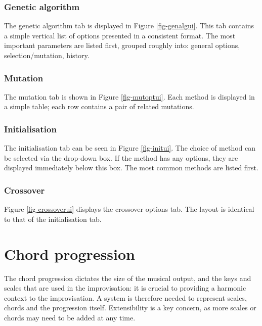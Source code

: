 \subsubsection{Genetic algorithm}


The genetic algorithm tab is displayed in Figure \ref{fig-genalgui}. This tab contains a simple vertical list of options presented in a consistent format. The most important parameters are listed first, grouped roughly into: general options, selection/mutation, history.

\subsubsection{Mutation}


The mutation tab is shown in Figure \ref{fig-mutoptui}. Each method is displayed in a simple table; each row contains a pair of related mutations. 

\subsubsection{Initialisation}


The initialisation tab can be seen in Figure \ref{fig-initui}. The choice of method can be selected via the drop-down box. If the method has any options, they are displayed immediately below this box. The most common methods are listed first.

\subsubsection{Crossover}


Figure \ref{fig-crossoverui} displays the crossover options tab. The layout is identical to that of the initialisation tab.

\section{Chord progression}

The chord progression dictates the size of the musical output, and the keys and scales that are used in the improvisation: it is crucial to providing a harmonic context to the improvisation. A system is therefore needed to represent scales, chords and the progression itself. Extensibility is a key concern, as more scales or chords may need to be added at any time.

